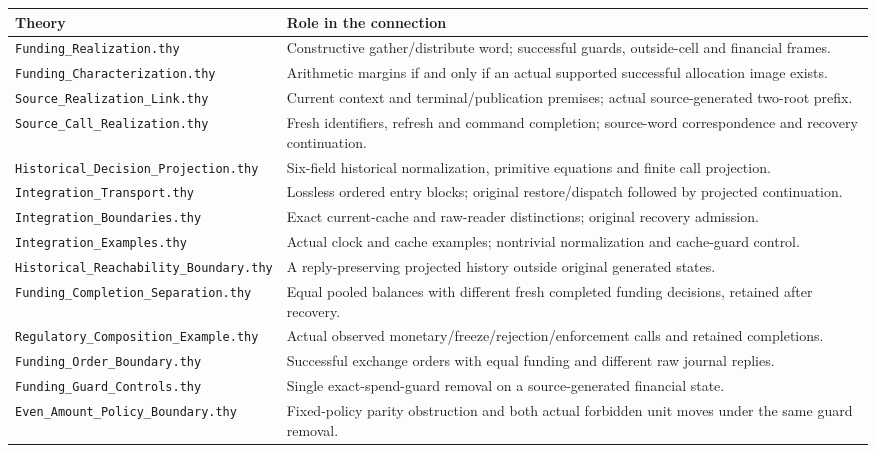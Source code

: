 \documentclass[10pt,a4paper]{article}
\newcommand{\code}[1]{\nolinkurl{#1}}
\newcommand{\source}[1]{\code{#1.thy}}
\begin{document}
{\small
\begin{longtable}{@{}p{}p{}@{}}
\toprule
Theory & Role in the connection\\
\midrule
\endhead
\source{Funding_Realization} & Constructive gather/distribute word; successful guards, outside-cell and financial frames.\\
\source{Funding_Characterization} & Arithmetic margins if and only if an actual supported successful allocation image exists.\\
\source{Source_Realization_Link} & Current context and terminal/publication premises; actual source-generated two-root prefix.\\
\source{Source_Call_Realization} & Fresh identifiers, refresh and command completion; source-word correspondence and recovery continuation.\\
\source{Historical_Decision_Projection} & Six-field historical normalization, primitive equations and finite call projection.\\
\source{Integration_Transport} & Lossless ordered entry blocks; original restore/dispatch followed by projected continuation.\\
\source{Integration_Boundaries} & Exact current-cache and raw-reader distinctions; original recovery admission.\\
\source{Integration_Examples} & Actual clock and cache examples; nontrivial normalization and cache-guard control.\\
\source{Historical_Reachability_Boundary} & A reply-preserving projected history outside original generated states.\\
\source{Funding_Completion_Separation} & Equal pooled balances with different fresh completed funding decisions, retained after recovery.\\
\source{Regulatory_Composition_Example} & Actual observed monetary/freeze/rejection/enforcement calls and retained completions.\\
\source{Funding_Order_Boundary} & Successful exchange orders with equal funding and different raw journal replies.\\
\source{Funding_Guard_Controls} & Single exact-spend-guard removal on a source-generated financial state.\\
\source{Even_Amount_Policy_Boundary} & Fixed-policy parity obstruction and both actual forbidden unit moves under the same guard removal.\\
\bottomrule
\end{longtable}
}

\begingroup
\small


\endgroup
\end{document}
